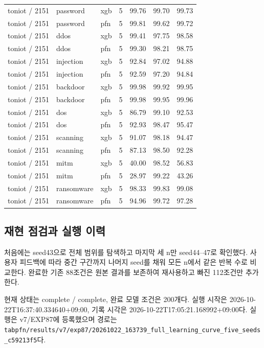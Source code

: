 \begin{longtable}
{}toniot /\allowbreak{} 2151 & password & xgb & 5 & 99.76 & 99.70 & 99.73 \\
{}toniot /\allowbreak{} 2151 & password & pfn & 5 & 99.81 & 99.62 & 99.72 \\
{}toniot /\allowbreak{} 2151 & ddos & xgb & 5 & 99.41 & 97.75 & 98.58 \\
{}toniot /\allowbreak{} 2151 & ddos & pfn & 5 & 99.30 & 98.21 & 98.75 \\
{}toniot /\allowbreak{} 2151 & injection & xgb & 5 & 92.84 & 97.02 & 94.88 \\
{}toniot /\allowbreak{} 2151 & injection & pfn & 5 & 92.59 & 97.20 & 94.84 \\
{}toniot /\allowbreak{} 2151 & backdoor & xgb & 5 & 99.98 & 99.92 & 99.95 \\
{}toniot /\allowbreak{} 2151 & backdoor & pfn & 5 & 99.98 & 99.95 & 99.96 \\
{}toniot /\allowbreak{} 2151 & dos & xgb & 5 & 86.79 & 99.10 & 92.53 \\
{}toniot /\allowbreak{} 2151 & dos & pfn & 5 & 92.93 & 98.47 & 95.47 \\
{}toniot /\allowbreak{} 2151 & scanning & xgb & 5 & 91.07 & 98.18 & 94.47 \\
{}toniot /\allowbreak{} 2151 & scanning & pfn & 5 & 87.13 & 98.50 & 92.28 \\
{}toniot /\allowbreak{} 2151 & mitm & xgb & 5 & 40.00 & 98.52 & 56.83 \\
{}toniot /\allowbreak{} 2151 & mitm & pfn & 5 & 28.97 & 99.22 & 43.26 \\
{}toniot /\allowbreak{} 2151 & ransomware & xgb & 5 & 98.33 & 99.83 & 99.08 \\
{}toniot /\allowbreak{} 2151 & ransomware & pfn & 5 & 94.96 & 99.72 & 97.28 \\
\bottomrule
\end{longtable}
\endgroup
\subsection{재현 점검과 실행 이력}
처음에는 seed43으로 전체 범위를 탐색하고 마지막 세 n만 seed44–47로 확인했다. 사용자 피드백에 따라 중간 구간까지 나머지 seed를 채워 모든 n에서 같은 반복 수로 비교한다. 완료한 기존 88조건은 원본 결과를 보존하여 재사용하고 빠진 112조건만 추가한다.

현재 상태는 complete /\allowbreak{} complete, 완료 모델 조건은 200개다. 실행 시작은 2026-10-22T16:37:40.334640+\allowbreak{}09:00, 기록 시각은 2026-10-22T17:05:21.168992+\allowbreak{}09:00다. 실행은 v7/\allowbreak{}EXP87에 등록했으며 경로는 \texttt{tabpfn/\allowbreak{}\allowbreak{}r\allowbreak{}esults/\allowbreak{}\allowbreak{}v\allowbreak{}7/\allowbreak{}\allowbreak{}exp87/\allowbreak{}\allowbreak{}20261022\allowbreak{}\_\allowbreak{}\allowbreak{}163739\_\allowbreak{}\allowbreak{}full\_\allowbreak{}\allowbreak{}lea\allowbreak{}rning\_\allowbreak{}\allowbreak{}cu\allowbreak{}rve\_\allowbreak{}\allowbreak{}five\allowbreak{}\_\allowbreak{}\allowbreak{}seeds\_\allowbreak{}\allowbreak{}c\allowbreak{}59213f5}다.

